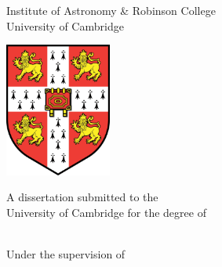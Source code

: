 \begin{titlepage}
    \begin{addmargin}[-1cm]{-3cm}
    \begin{center}

        \large 

        \hfill

        \vfill

        \begingroup
            \color{Maroon}\LARGE{\spacedallcaps{\myTitle}} \\ \bigskip
        \endgroup

        \vspace{2cm}

        \Large{\spacedallcaps{\myName}} \\
        \large{Institute of Astronomy \& Robinson College} \\
        \large{University of Cambridge} \\

        \vfill

        \includegraphics[width=3.5cm]{figures/Cambridge_University_Crest_-_flat.png} \\ \medskip

        \vspace{1cm}

        A dissertation submitted to the \\
        University of Cambridge for the degree of \\
         \\ \bigskip

        \vspace{1cm}

        Under the supervision of \\
         \\
         \\


\end{center}
\end{addmargin}
\end{titlepage}
